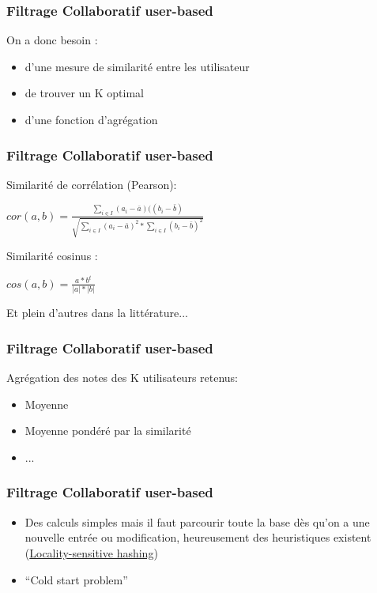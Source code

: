 \documentclass{formation}
\begin{document}
\begin{frame}
  \frametitle{Filtrage Collaboratif user-based}
  On a donc besoin :
  \begin{itemize}
  \item d'une mesure de similarité entre les utilisateur
  \item de trouver un K optimal
  \item d'une fonction d'agrégation
  \end{itemize}
\end{frame}

\begin{frame}
  \frametitle{Filtrage Collaboratif user-based}
  Similarité de corrélation (Pearson):\\
  \begin{center}
    $cor(a,b)=\frac{ \sum_{i \in I} (a_i - \bar{a})((b_i - \bar{b})}{\sqrt{\sum_{i \in I} (a_i - \bar{a})^2*\sum_{i \in I} (b_i - \bar{b})^2}}$ \\
  \end{center}
  Similarité cosinus :\\
  \begin{center}
    $cos(a,b)=\frac{a*b^t}{|a|*|b|}$
  \end{center}
  Et plein d'autres dans la littérature...
\end{frame}

\begin{frame}
  \frametitle{Filtrage Collaboratif user-based}
  Agrégation des notes des K utilisateurs retenus:
  \begin{itemize}
  \item Moyenne
  \item Moyenne pondéré par la similarité
  \item ...
  \end{itemize}
\end{frame}

\begin{frame}
  \frametitle{Filtrage Collaboratif user-based}
  \begin{itemize}[<+->]
  \item Des calculs simples mais il faut parcourir toute la base dès qu'on a une nouvelle entrée ou modification, heureusement des heuristiques existent (\href{https://en.wikipedia.org/wiki/Locality-sensitive_hashing}{Locality-sensitive hashing})
  \item ``Cold start problem''
  \end{itemize}
\end{frame}
\end{document}
